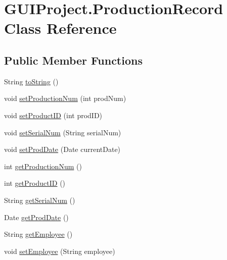 \hypertarget{class_g_u_i_project_1_1_production_record}{}\section{G\+U\+I\+Project.\+Production\+Record Class Reference}
\label{class_g_u_i_project_1_1_production_record}
\subsection*{Public Member Functions}
\begin{DoxyCompactItemize}
\item 
String \mbox{\hyperlink{class_g_u_i_project_1_1_production_record_a5fc9ac59bf5886f0b00ae3d9c491f64b}{to\+String}} ()
\item 
void \mbox{\hyperlink{class_g_u_i_project_1_1_production_record_a9e3ed71a4d5301684ffcdc59ae1211f1}{set\+Production\+Num}} (int prod\+Num)
\item 
void \mbox{\hyperlink{class_g_u_i_project_1_1_production_record_a46c870d9820965e950df5f5c3d42209a}{set\+Product\+ID}} (int prod\+ID)
\item 
void \mbox{\hyperlink{class_g_u_i_project_1_1_production_record_a989bfbd7de039c6bfcfeed41a0818c2c}{set\+Serial\+Num}} (String serial\+Num)
\item 
void \mbox{\hyperlink{class_g_u_i_project_1_1_production_record_a4f5a2a74b0a6635c421dff2b90afd866}{set\+Prod\+Date}} (Date current\+Date)
\item 
int \mbox{\hyperlink{class_g_u_i_project_1_1_production_record_a4e54a362ea073dc384d4c0f7746c6ad4}{get\+Production\+Num}} ()
\item 
int \mbox{\hyperlink{class_g_u_i_project_1_1_production_record_af9913b5112761715b5b99c2d1153a8ef}{get\+Product\+ID}} ()
\item 
String \mbox{\hyperlink{class_g_u_i_project_1_1_production_record_a233c37c4649b043691b0d00be54b42a6}{get\+Serial\+Num}} ()
\item 
Date \mbox{\hyperlink{class_g_u_i_project_1_1_production_record_a223e246e5bd4ff4db0f2314040fb0274}{get\+Prod\+Date}} ()
\item 
String \mbox{\hyperlink{class_g_u_i_project_1_1_production_record_a216bffccf7120bdeb9fff45eb1cd6fcd}{get\+Employee}} ()
\item 
void \mbox{\hyperlink{class_g_u_i_project_1_1_production_record_abdb239f823249bb8b490d5b8b71f3ab2}{set\+Employee}} (String employee)
\end{DoxyCompactItemize}
